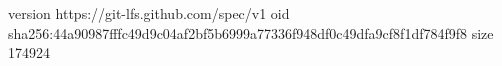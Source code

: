 version https://git-lfs.github.com/spec/v1
oid sha256:44a90987fffc49d9c04af2bf5b6999a77336f948df0c49dfa9cf8f1df784f9f8
size 174924
